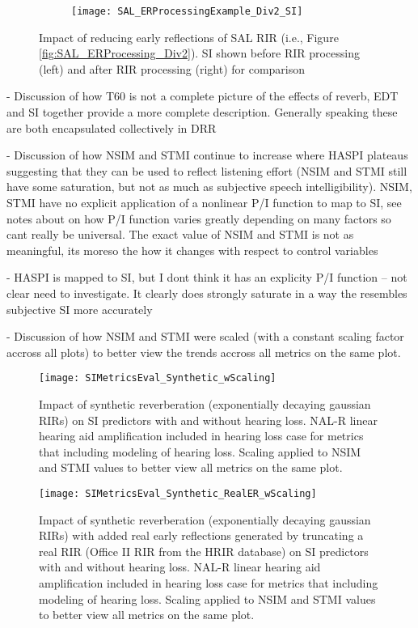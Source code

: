 \begin{figure}[H]
	\centering
	\begin{subfigure}[b]{0.98\textwidth}
		\centering
		\texttt{[image: SAL\_ERProcessingExample\_Div2\_SI]}
	\end{subfigure}
	\caption{Impact of reducing early reflections of SAL RIR (i.e., Figure \ref{fig:SAL_ERProcessing_Div2}). SI shown before RIR processing (left) and after RIR processing (right) for comparison}
\label{fig:SAL_ERProcessing_Div2_SI_Results}
\end{figure}


- Discussion of how T60 is not a complete picture of the effects of reverb, EDT and SI together provide a more complete description. Generally speaking these are both encapsulated collectively in DRR

- Discussion of how NSIM and STMI continue to increase where HASPI plateaus suggesting that they can be used to reflect listening effort (NSIM and STMI still have some saturation, but not as much as subjective speech intelligibility). NSIM, STMI have no explicit application of a nonlinear  P/I function to map to SI, see notes about on how P/I function varies greatly depending on many factors so cant really be universal. The exact value of NSIM and STMI is not as meaningful, its moreso the how it changes with respect to control variables

- HASPI is mapped to SI, but I dont think it has an explicity P/I function -- not clear need to investigate. It clearly does strongly saturate in a way the resembles subjective SI more accurately

- Discussion of how NSIM and STMI were scaled (with a constant scaling factor accross all plots) to better view the trends accross all metrics on the same plot.

\begin{figure}[H]
	\texttt{[image: SIMetricsEval\_Synthetic\_wScaling]}
	\centering
	\caption{Impact of synthetic reverberation (exponentially decaying gaussian RIRs) on SI predictors with and without hearing loss. NAL-R linear hearing aid amplification included in hearing loss case for metrics that including modeling of hearing loss. Scaling applied to NSIM and STMI values to better view all metrics on the same plot.}
	\label{fig:SIMetricsEval_Synthetic_wScaling}
\end{figure}

\begin{figure}[H]
	\texttt{[image: SIMetricsEval\_Synthetic\_RealER\_wScaling]}
	\centering
	\caption{Impact of synthetic reverberation (exponentially decaying gaussian RIRs) with added real early reflections generated by truncating a real RIR  (Office II RIR from the HRIR database) on SI predictors with and without hearing loss. NAL-R linear hearing aid amplification included in hearing loss case for metrics that including modeling of hearing loss. Scaling applied to NSIM and STMI values to better view all metrics on the same plot.}
	\label{fig:SIMetricsEval_Synthetic_RealER_wScaling}
\end{figure}

